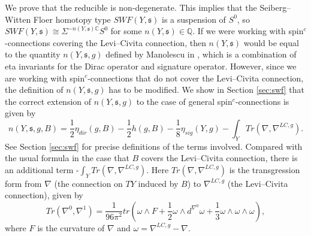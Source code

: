 \documentclass{amsart}
\theoremstyle{definition}
\theoremstyle{remark}
\numberwithin{equation}{section}
\begin{document}
We prove that the reducible is non-degenerate. This implies that the Seiberg--Witten Floer homotopy type $SWF(Y , \mathfrak{s})$ is a suspension of $S^0$, so $SWF(Y , \mathfrak{s}) \cong \Sigma^{-n(Y,\mathfrak{s}) \mathbb{C}} S^0$ for some $n(Y , \mathfrak{s}) \in \mathbb{Q}$. If we were working with spin$^c$-connections covering the Levi--Civita connection, then $n(Y , \mathfrak{s})$ would be equal to the quantity $n(Y , \mathfrak{s} , g)$ defined by Manolescu in \cite{man}, which is a combination of eta invariants for the Dirac operator and signature operator. However, since we are working with spin$^c$-connections that do not cover the Levi--Civita connection, the definition of $n(Y , \mathfrak{s} , g )$ has to be modified. We show in Section \ref{sec:swf} that the correct extension of $n(Y , \mathfrak{s} , g)$ to the case of general spin$^c$-connections is given by
\begin{equation}\label{equ:n}
n(Y,\mathfrak{s} , g ,B ) = \frac{1}{2}\eta_{dir}(g,B) - \frac{1}{2}h(g,B) - \frac{1}{8}\eta_{sig}(Y,g) - \int_Y Tr(\nabla , \nabla^{LC,g}).
\end{equation}
See Section \ref{sec:swf} for precise definitions of the terms involved. Compared with the usual formula in the case that $B$ covers the Levi--Civita connection, there is an additional term -$\int_Y Tr(\nabla , \nabla^{LC,g})$. Here $Tr(\nabla , \nabla^{LC,g})$ is the transgression form from $\nabla$ (the connection on $TY$ induced by $B$) to $\nabla^{LC,g}$ (the Levi--Civita connection), given by 
\[
Tr(\nabla^0 , \nabla^1) = \frac{1}{96\pi^2} tr\left( \omega \wedge F + \frac{1}{2} \omega \wedge d^{\nabla^0} \omega + \frac{1}{3} \omega \wedge \omega \wedge \omega \right),
\]
where $F$ is the curvature of $\nabla$ and $\omega = \nabla^{LC,g} - \nabla$.
\end{document}
